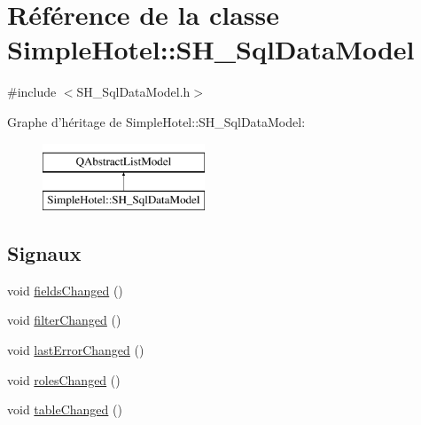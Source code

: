 \hypertarget{classSimpleHotel_1_1SH__SqlDataModel}{\section{Référence de la classe Simple\-Hotel\-:\-:S\-H\-\_\-\-Sql\-Data\-Model}
\label{classSimpleHotel_1_1SH__SqlDataModel}
}


{\ttfamily \#include $<$S\-H\-\_\-\-Sql\-Data\-Model.\-h$>$}

Graphe d'héritage de Simple\-Hotel\-:\-:S\-H\-\_\-\-Sql\-Data\-Model\-:\begin{figure}[H]
\begin{center}
\leavevmode
\includegraphics[height=2.000000cm]{classSimpleHotel_1_1SH__SqlDataModel}
\end{center}
\end{figure}
\subsection*{Signaux}
\begin{DoxyCompactItemize}
\item 
void \hyperlink{classSimpleHotel_1_1SH__SqlDataModel_add54351eeeb2b613df969698eaccb8b9}{fields\-Changed} ()
\item 
void \hyperlink{classSimpleHotel_1_1SH__SqlDataModel_aea10c1405845ef5ef6c9bcbc8f25bd48}{filter\-Changed} ()
\item 
void \hyperlink{classSimpleHotel_1_1SH__SqlDataModel_acda54d691c0f6996a20f520034e83ce7}{last\-Error\-Changed} ()
\item 
void \hyperlink{classSimpleHotel_1_1SH__SqlDataModel_ad41e76d8d2a2a0e0834925798b594275}{roles\-Changed} ()
\item 
void \hyperlink{classSimpleHotel_1_1SH__SqlDataModel_af1dc4861b6a6b1b66071afc8392054df}{table\-Changed} ()
\end{DoxyCompactItemize}
